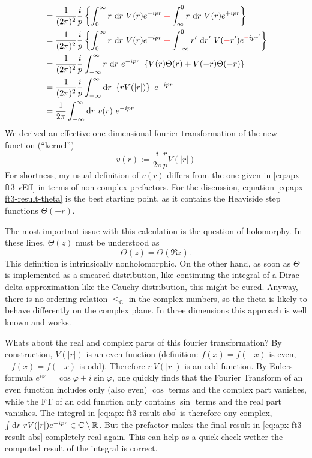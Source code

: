 \documentclass[12pt,a4paper]{report}
\numberwithin{equation}{chapter}
\begin{document}
\begin{appendices}
\begin{subequations}
\begin{align}
{}
\label{eq:apx-ft3-intminus}
&= \frac 1{(2\pi)^2} \frac ip \left\{ \int_0^\infty r~\d r~V(r) e^{-ipr} \redplus \int_{\infty}^0 r~\d r~V(r) e^{+ipr} \right\} \\
\label{eq:apx-ft3-subst-r}
&= \frac 1{(2\pi)^2} \frac ip \left\{ \int_0^\infty r~\d r~V(r) e^{-ipr} \redplus \int_{\redmin \infty}^0 r'~\d r'~V(\redmin r') e^{\redmin i p r'} \right\} \\
\label{eq:apx-ft3-result-theta}
&= \frac 1{(2\pi)^2} \frac ip \int_{-\infty}^\infty r~\d r~ e^{-ipr}~
\left\{ V(r) \Theta(r) + V(-r) \Theta(-r) \right\} \\
\label{eq:apx-ft3-result-abs}
&= \frac 1{(2\pi)^2} \frac ip \int_{-\infty}^\infty \d r~ \left\{ r V(|r|) \right\}~e^{-ipr} \\
\label{eq:apx-ft3-result-vEff}
&= \frac{1}{2\pi} \int_{-\infty}^\infty \d r~v(r)~e^{-ipr}
\end{align}
\end{subequations}
We derived an effective one dimensional fourier transformation of the new function (``kernel'')
\begin{equation}\label{eq:apx-ft3-vEff}
v(r) := \frac{i}{2\pi} \frac rp V(|r|)
\end{equation}
For shortness, my usual definition of $v(r)$ differs from the one given in \eqref{eq:apx-ft3-vEff} in terms of non-complex prefactors. For the discussion, equation \eqref{eq:apx-ft3-result-theta} is the best starting point, as it contains the Heaviside step functions $\Theta(\pm r)$.

The most important issue with this calculation is the question of holomorphy. In these lines, $\Theta(z)$ must be understood as
\begin{equation}
\Theta(z) = \Theta(\Re z).
\end{equation}
This definition is intrinsically nonholomorphic. On the other hand, as soon as $\Theta$ is implemented as a smeared distribution, like continuing the integral of a Dirac delta approximation like the Cauchy distribution, this might be cured. Anyway, there is no ordering relation $\leq_\mathbb{C}$ in the complex numbers, so the theta is likely to behave differently on the complex plane. In three dimensions this approach is well known and works.

Whats about the real and complex parts of this fourier transformation? By construction, $V(|r|)$ is an even function (definition: $f(x)=f(-x)$ is even, $-f(x)=f(-x)$ is odd). Therefore $r~V(|r|)$ is an odd function. By Eulers formula $e^{i\varphi} = \cos \varphi + i \sin \varphi$, one quickly finds that the Fourier Transform of an even function includes only (also even) $\cos$ terms and the complex part vanishes, while the FT of an odd function only contains $\sin$ terms and the real part vanishes. The integral in \eqref{eq:apx-ft3-result-abs} is therefore ony complex, $\int \mathrm{d} r~rV(|r|)e^{-ipr} \in \mathbb{C} \setminus \mathbb{R}$. But the prefactor makes the final result in \eqref{eq:apx-ft3-result-abs} completely real again. This can help as a quick check wether the computed result of the integral is correct.


\end{appendices}
\end{document}
